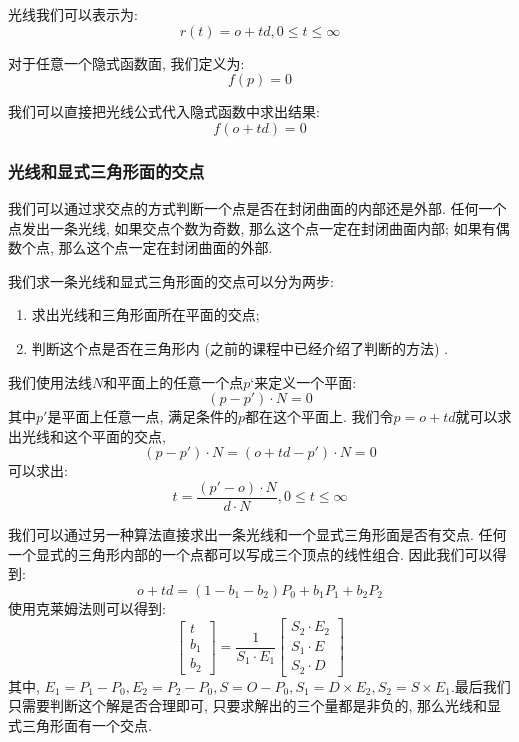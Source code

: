 光线我们可以表示为: 
\begin{equation}
	r(t)=o+td, 0\le t \le \infty
\end{equation}

对于任意一个隐式函数面, 我们定义为: 
\begin{equation}
	f(p)=0
\end{equation}

我们可以直接把光线公式代入隐式函数中求出结果: 
\begin{equation}
	f(o+td)=0
\end{equation}

\subsubsection{光线和显式三角形面的交点}
我们可以通过求交点的方式判断一个点是否在封闭曲面的内部还是外部. 任何一个点发出一条光线, 如果交点个数为奇数, 那么这个点一定在封闭曲面内部; 如果有偶数个点, 那么这个点一定在封闭曲面的外部. 

我们求一条光线和显式三角形面的交点可以分为两步: 
\begin{enumerate}
	\item 求出光线和三角形面所在平面的交点; 
	\item 判断这个点是否在三角形内 (之前的课程中已经介绍了判断的方法) . 
\end{enumerate}

我们使用法线$N$和平面上的任意一个点$p‘$来定义一个平面: 
\begin{equation}
	(p-p')\cdot N = 0
\end{equation}
其中$p'$是平面上任意一点, 满足条件的$p$都在这个平面上. 我们令$p=o+td$就可以求出光线和这个平面的交点, 
\begin{equation}
	(p-p')\cdot N = (o+td-p')\cdot N = 0
\end{equation}
可以求出: 
\begin{equation}
	t = \frac{(p'-o)\cdot N}{d\cdot N}, 0\le t \le \infty
\end{equation}

我们可以通过另一种算法直接求出一条光线和一个显式三角形面是否有交点. 任何一个显式的三角形内部的一个点都可以写成三个顶点的线性组合. 因此我们可以得到: 
\begin{equation}
	o+td=(1-b_1-b_2)P_0+b_1P_1+b_2P_2
\end{equation}使用克莱姆法则可以得到: 
\begin{equation}
	\begin{bmatrix}
		t\\ 
		b_1\\ 
		b_2
	\end{bmatrix}=\frac{1}{S_1\cdot E_1}\begin{bmatrix}
		S_2\cdot E_2\\ 
		S_1\cdot E\\ 
		S_2\cdot D
	\end{bmatrix}
\end{equation}其中, $E_1=P_1-P_0,E_2=P_2-P_0,S=O-P_0,S_1=D\times E_2, S_2=S\times E_1$.最后我们只需要判断这个解是否合理即可, 只要求解出的三个量都是非负的, 那么光线和显式三角形面有一个交点. 

